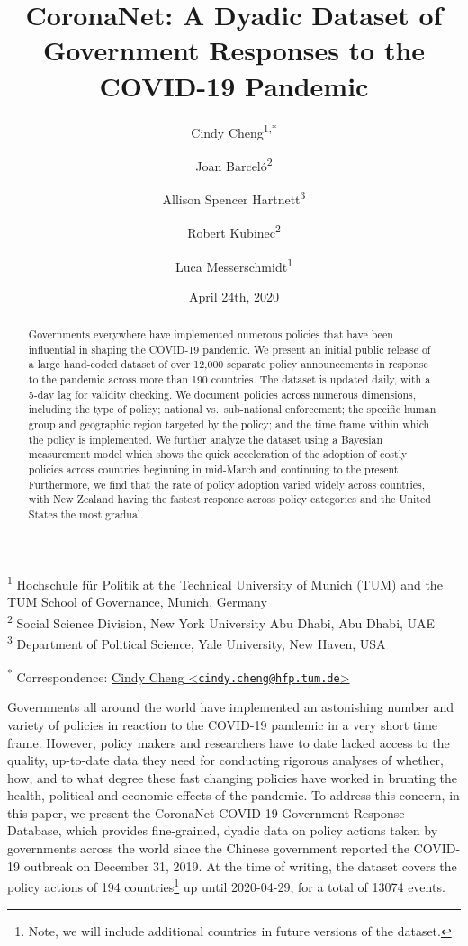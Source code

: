 \documentclass[
]{article}
\title{CoronaNet: A Dyadic Dataset of Government Responses to the COVID-19 Pandemic}
\author{Cindy Cheng\textsuperscript{1,*} \and Joan Barceló\textsuperscript{2} \and Allison Spencer Hartnett\textsuperscript{3} \and Robert Kubinec\textsuperscript{2} \and Luca Messerschmidt\textsuperscript{1}}
\date{April 24th, 2020}
\begin{document}
\maketitle
\begin{abstract}
Governments everywhere have implemented numerous policies that have been influential in shaping the COVID-19 pandemic. We present an initial public release of a large hand-coded dataset of over 12,000 separate policy announcements in response to the pandemic across more than 190 countries. The dataset is updated daily, with a 5-day lag for validity checking. We document policies across numerous dimensions, including the type of policy; national vs.~sub-national enforcement; the specific human group and geographic region targeted by the policy; and the time frame within which the policy is implemented. We further analyze the dataset using a Bayesian measurement model which shows the quick acceleration of the adoption of costly policies across countries beginning in mid-March and continuing to the present. Furthermore, we find that the rate of policy adoption varied widely across countries, with New Zealand having the fastest response across policy categories and the United States the most gradual.
\end{abstract}

\textsuperscript{1} Hochschule für Politik at the Technical University of Munich (TUM) and the TUM School of Governance, Munich, Germany\\
\textsuperscript{2} Social Science Division, New York University Abu Dhabi, Abu Dhabi, UAE\\
\textsuperscript{3} Department of Political Science, Yale University, New Haven, USA

\textsuperscript{*} Correspondence: \href{mailto:cindy.cheng@hfp.tum.de}{Cindy Cheng \textless{}\href{mailto:cindy.cheng@hfp.tum.de}{\nolinkurl{cindy.cheng@hfp.tum.de}}\textgreater{}}

\newpage

Governments all around the world have implemented an astonishing number and variety of policies in reaction to the COVID-19 pandemic in a very short time frame. However, policy makers and researchers have to date lacked access to the quality, up-to-date data they need for conducting rigorous analyses of whether, how, and to what degree these fast changing policies have worked in brunting the health, political and economic effects of the pandemic. To address this concern, in this paper, we present the CoronaNet COVID-19 Government Response Database, which provides fine-grained, dyadic data on policy actions taken by governments across the world since the Chinese government reported the COVID-19 outbreak on December 31, 2019. At the time of writing, the dataset covers the policy actions of 194 countries\footnote{Note, we will include additional countries in future versions of the dataset.} up until 2020-04-29, for a total of 13074 events.
\end{document}
